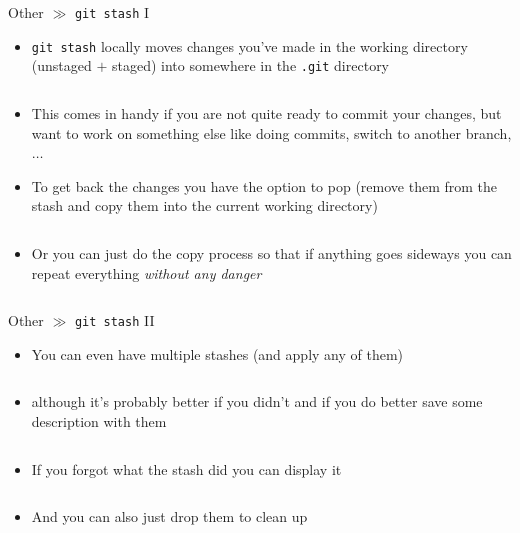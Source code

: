 \documentclass[10pt]{beamer}
\begin{document}
\begin{frame}{Other $\gg$ \texttt{git stash} I}
\begin{itemize}
	\item \texttt{git stash} locally moves changes you've made in the working directory (unstaged $+$ staged) into somewhere in the \texttt{.git} directory
	\inputminted[bgcolor=lightGreyCustom,fontsize=\scriptsize]{sh}{./resources/git_stash_01_stash.sh}
	\item This comes in handy if you are not quite ready to commit your changes, but want to work on something else like doing commits, switch to another branch, $\dots$
	\item To get back the changes you have the option to pop (remove them from the stash and copy them into the current working directory)
	\inputminted[bgcolor=lightGreyCustom,fontsize=\scriptsize]{sh}{./resources/git_stash_02_stash_pop.sh}
	\item Or you can just do the copy process so that if anything goes sideways you can repeat everything \textit{without any danger}
	\inputminted[bgcolor=lightGreyCustom,fontsize=\scriptsize]{sh}{./resources/git_stash_03_stash_apply.sh}
\end{itemize}
\end{frame}

\begin{frame}{Other $\gg$ \texttt{git stash} II}
\begin{itemize}
	\item You can even have multiple stashes (and apply any of them)
	\inputminted[bgcolor=lightGreyCustom,fontsize=\scriptsize]{sh}{./resources/git_stash_04_stash_list.sh}
	\item although it's probably better if you didn't and if you do better save some description with them
	\inputminted[bgcolor=lightGreyCustom,fontsize=\scriptsize]{sh}{./resources/git_stash_05_stash_save.sh}
	\item If you forgot what the stash did you can display it
	\inputminted[bgcolor=lightGreyCustom,fontsize=\scriptsize]{sh}{./resources/git_stash_06_stash_show.sh}
	\item And you can also just drop them to clean up
	\inputminted[bgcolor=lightGreyCustom,fontsize=\scriptsize]{sh}{./resources/git_stash_07_drop.sh}
\end{itemize}
\end{frame}
\end{document}
